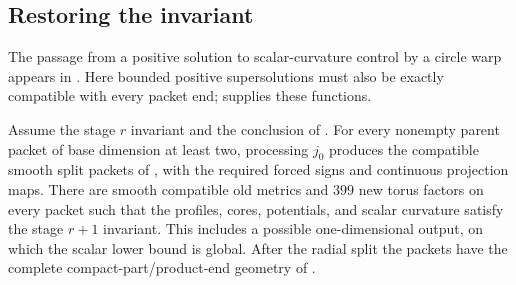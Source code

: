 \subsection{Restoring the invariant}

The passage from a positive solution to scalar-curvature control by a
circle warp appears in
\citet[Theorem~4\textup{(ii)}]{fischerColbrieSchoen1980}.
Here bounded positive supersolutions must also be exactly compatible
with every packet end;  supplies these functions.

\begin{proposition}\label{regular:step}
Assume the stage $r$ invariant and the conclusion of
.  For every nonempty parent packet of base
dimension at least two, processing $j_0$ produces the compatible
smooth split packets of
, with the required forced signs and continuous
projection maps.  There are smooth compatible old metrics and $399$
new torus factors on every packet such that the profiles, cores,
potentials, and scalar curvature satisfy the stage $r+1$ invariant.
This includes a possible one-dimensional output, on which the scalar
lower bound is global.  After the radial split the packets have the
complete compact-part/product-end geometry of
.
\end{proposition}

